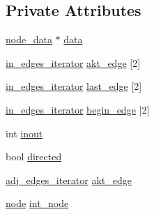\subsection*{Private Attributes}
\begin{DoxyCompactItemize}
\item 
\mbox{\hyperlink{classnode__data}{node\+\_\+data}} $\ast$ \mbox{\hyperlink{classnode_a4ae3d54ebb61be3a102bedf5b91bef75}{data}}
\item 
\mbox{\hyperlink{classnode_a9a96be92add7c1a2771bcd0431ebf8ab}{in\+\_\+edges\+\_\+iterator}} \mbox{\hyperlink{classnode_adea0d78e10bae12b86a65f27d1aa98c7}{akt\+\_\+edge}} \mbox{[}2\mbox{]}
\item 
\mbox{\hyperlink{classnode_a9a96be92add7c1a2771bcd0431ebf8ab}{in\+\_\+edges\+\_\+iterator}} \mbox{\hyperlink{classnode_a35449752b36330ed35552193166e96b0}{last\+\_\+edge}} \mbox{[}2\mbox{]}
\item 
\mbox{\hyperlink{classnode_a9a96be92add7c1a2771bcd0431ebf8ab}{in\+\_\+edges\+\_\+iterator}} \mbox{\hyperlink{classnode_a2774efbd986e9e126c0bc5cb60523ff9}{begin\+\_\+edge}} \mbox{[}2\mbox{]}
\item 
int \mbox{\hyperlink{classnode_a2cfc899adde47c9ce3a6d6610a369e23}{inout}}
\item 
bool \mbox{\hyperlink{classnode_ab1b38276f1b8ca748cf1d95be98201c1}{directed}}
\item 
\mbox{\hyperlink{classnode_abdd49248203010f2d5432dfef22d017a}{adj\+\_\+edges\+\_\+iterator}} \mbox{\hyperlink{classnode_a56cf4b809cc3b1a7f03327caff125d52}{akt\+\_\+edge}}
\item 
\mbox{\hyperlink{classnode}{node}} \mbox{\hyperlink{classnode_aea3ac7e8efe26d960bc6c76f741ebce5}{int\+\_\+node}}
\end{DoxyCompactItemize}
